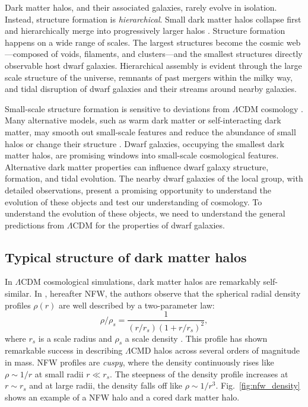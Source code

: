 Dark matter halos, and their associated galaxies, rarely evolve in
isolation. Instead, structure formation is \emph{hierarchical}. Small
dark matter halos collapse first and hierarchically merge into
progressively larger halos
\citep[e.g.,][]{blumenthal+1984, blumenthal+1986, white+rees1978, white+frenk1991, somerville+dave2015}.
Structure formation happens on a wide range of scales. The largest
structures become the cosmic web---composed of voids, filaments, and
clusters---and the smallest structures directly observable host dwarf
galaxies. Hierarchical assembly is evident through the large scale
structure of the universe, remnants of past mergers within the milky
way, and tidal disruption of dwarf galaxies and their streams around
nearby galaxies.

Small-scale structure formation is sensitive to deviations from
\(\Lambda\)CDM cosmology \citep[e.g.,][]{bechtol+2022}. Many alternative
models, such as warm dark matter or self-interacting dark matter, may
smooth out small-scale features and reduce the abundance of small halos
or change their structure \citep[e.g.,][]{lovell+2014}. Dwarf galaxies,
occupying the smallest dark matter halos, are promising windows into
small-scale cosmological features. Alternative dark matter properties
can influence dwarf galaxy structure, formation, and tidal evolution.
The nearby dwarf galaxies of the local group, with detailed
observations, present a promising opportunity to understand the
evolution of these objects and test our understanding of cosmology. To
understand the evolution of these objects, we need to understand the
general predictions from \(\Lambda\)CDM for the properties of dwarf
galaxies.

\subsection{Typical structure of dark matter
halos}\label{typical-structure-of-dark-matter-halos}

In \(\Lambda\)CDM cosmological simulations, dark matter halos are
remarkably self-similar. In \citet{NFW1996, NFW1997}, hereafter NFW, the
authors observe that the spherical radial density profiles \(\rho(r)\)
are well described by a two-parameter law: \begin{equation}{
\rho/\rho_s= \frac{1}{(r/r_s)(1+r/r_s)^2},
}\end{equation} where \(r_s\) is a scale radius and \(\rho_s\) a scale
density . This profile has shown remarkable success in describing
\(\Lambda\)CMD halos across several orders of magnitude in mass. NFW
profiles are \emph{cuspy}, where the density continuously rises like
\(\rho \sim 1/r\) at small radii \(r \ll r_s\). The steepness of the
density profile increases at \(r \sim r_s\) and at large radii, the
density falls off like \(\rho \sim 1/r^3\). Fig.~\ref{fig:nfw_density}
shows an example of a NFW halo and a cored dark matter halo.

